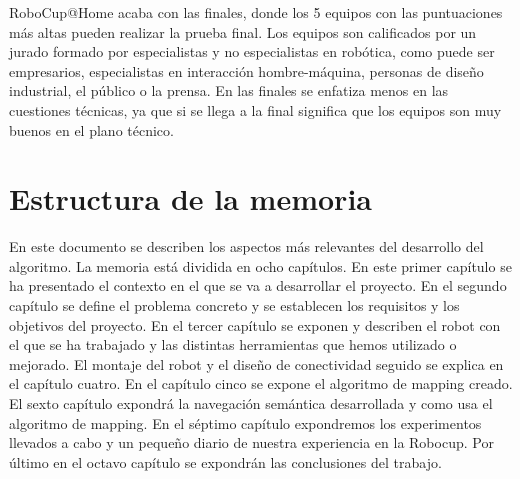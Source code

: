 RoboCup@Home acaba con las finales, donde los 5 equipos con las puntuaciones más altas pueden realizar la prueba final. Los equipos son calificados por un jurado formado por especialistas y no especialistas en robótica, como puede ser empresarios, especialistas en interacción hombre-máquina, personas de diseño industrial, el público o la prensa. En las finales se enfatiza menos en las cuestiones técnicas, ya que si se llega a la final significa que los equipos son muy buenos en el plano técnico.

\section{Estructura de la memoria}
\label{cap:estructuradelamemoria}
En este documento se describen los aspectos más relevantes del desarrollo del algoritmo. La memoria está dividida en ocho capítulos. En este primer capítulo se ha presentado el contexto en el que se va a desarrollar el proyecto. En el segundo capítulo se define el problema concreto y se establecen los requisitos y los objetivos del proyecto. En el tercer capítulo se exponen y describen el robot con el que se ha trabajado y las distintas herramientas que hemos utilizado o mejorado. El montaje del robot y el diseño de conectividad seguido se explica en el capítulo cuatro. En el capítulo cinco se expone el algoritmo de mapping creado. El sexto capítulo expondrá la navegación semántica desarrollada y como usa el algoritmo de mapping. En el séptimo capítulo expondremos los experimentos llevados a cabo y un pequeño diario de nuestra experiencia en la Robocup. Por último en el octavo capítulo se expondrán las conclusiones del trabajo.
